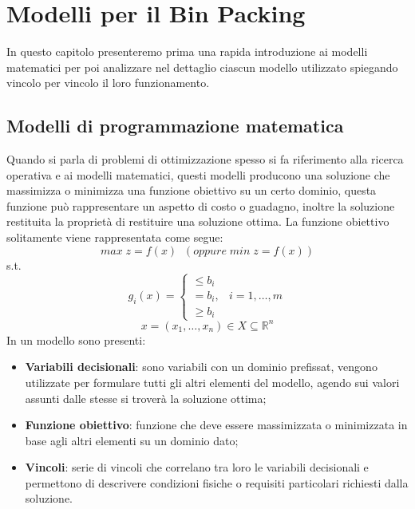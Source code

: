 
\chapter{Modelli per il Bin Packing}\label{chap:four}
In questo capitolo presenteremo prima una rapida introduzione ai modelli matematici per poi analizzare nel dettaglio ciascun modello utilizzato spiegando vincolo per vincolo il loro funzionamento.

\section{Modelli di programmazione matematica}
Quando si parla di problemi di ottimizzazione spesso si fa riferimento alla ricerca operativa e ai modelli matematici, questi modelli producono una soluzione che  massimizza o minimizza una funzione obiettivo su un certo dominio, questa funzione può rappresentare un aspetto di costo o guadagno,  inoltre la soluzione restituita la proprietà di restituire una soluzione ottima. La funzione obiettivo solitamente viene rappresentata come segue:
$$ max\; z = f ( x )\;\; (oppure\; min\; z = f ( x ))$$
s.t.
$$g_i (x) = \begin{cases} \leq b_i \\ = b_i, & i = 1,\dots,m \\ \geq b_i \end{cases}$$
$$x = (x_1,\dots,x_n) \in X \subseteq \mathbb{R}^n$$
In un modello sono presenti:
\begin{itemize}
    \item \textbf{Variabili decisionali}: sono variabili con un dominio prefissat, vengono utilizzate per formulare tutti gli altri elementi del modello, agendo sui valori assunti dalle stesse si troverà la soluzione ottima;
    \item \textbf{Funzione obiettivo}: funzione che deve essere massimizzata o minimizzata in base agli altri elementi su un dominio dato;
    \item \textbf{Vincoli}: serie di vincoli che correlano tra loro le variabili decisionali e permettono di descrivere condizioni fisiche o requisiti particolari richiesti dalla soluzione.
\end{itemize}
